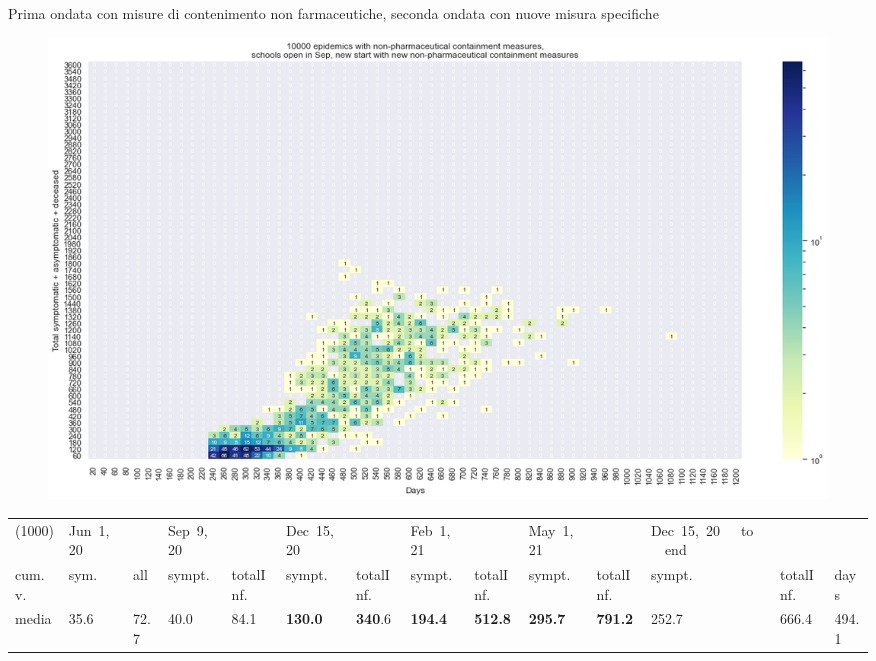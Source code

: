 \documentclass[]{beamer}
\begin{document}
\begin{frame}{Prima ondata con misure di contenimento non farmaceutiche, seconda ondata con nuove misura specifiche}


\begin{figure}[H]
\center
\includegraphics[scale=0.22]{10kForceWave2Contr2.png}
\label{selForceWave2Contr2}
\end{figure}


\begin{table}[H]
\center
\tiny
\begin{tabular}{p{0.4cm}p{0.3cm}p{0.3cm}p{0.3cm}p{0.3cm}p{0.3cm}p{0.3cm}p{0.3cm}p{0.3cm}p{0.3cm}p{0.3cm}p{0.3cm}p{0.3cm}p{0.4cm}}
\toprule
(1000) &  Jun~1,~20 & &  Sep~9,~20 & & Dec~15,~20 & & Feb~1,~21 & & May~1,~21 & & Dec~15,~20~~~to~~~end   \\
cum.~v. &  sym. &  all &  sympt. &  totalInf. &  sympt. &  totalInf. &  sympt. &  totalInf. &  sympt. &  totalInf. &  sympt. &  totalInf.  & days\\
\midrule
media  &     35.6 &                       72.7 &     40.0 &                       84.1 &    \textbf{130.0} &                      \textbf{340}.6 &    \textbf{194.4} &                      \textbf{512.8} &    \textbf{295.7} &                      \textbf{791.2} &               252.7 &                   666.4 &  494.1 \\
\bottomrule
\end{tabular}

\label{selSpontWave2Contr2Tab}
\end{table}


\end{frame}
\end{document}
